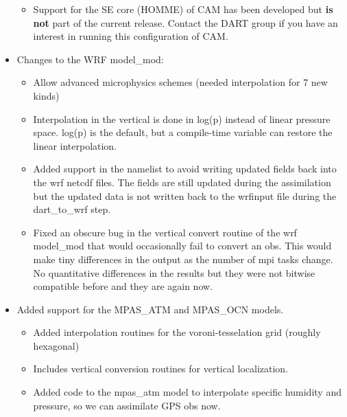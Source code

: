 \documentclass[letterpaper,10pt,english]{sphinxmanual}
\begin{document}
\begin{itemize}
\begin{itemize}
\begin{itemize}
\end{itemize}

\item {} 
Support for the SE core (HOMME) of CAM has been developed but
\textbf{is not} part of the current release. Contact the DART group
if you have an interest in running this configuration of CAM.

\end{itemize}

\item {} 
Changes to the WRF model\_mod:
\begin{itemize}
\item {} 
Allow advanced microphysics schemes (needed interpolation for 7
new kinds)

\item {} 
Interpolation in the vertical is done in log(p) instead of
linear pressure space. log(p) is the default, but a compile-time
variable can restore the linear interpolation.

\item {} 
Added support in the namelist to avoid writing updated fields
back into the wrf netcdf files. The fields are still updated
during the assimilation but the updated data is not written back
to the wrfinput file during the dart\_to\_wrf step.

\item {} 
Fixed an obscure bug in the vertical convert routine of the wrf
model\_mod that would occasionally fail to convert an obs. This
would make tiny differences in the output as the number of mpi
tasks change. No quantitative differences in the results but
they were not bitwise compatible before and they are again now.

\end{itemize}

\item {} 
Added support for the MPAS\_ATM and MPAS\_OCN models.
\begin{itemize}
\item {} 
Added interpolation routines for the voroni-tesselation grid
(roughly hexagonal)

\item {} 
Includes vertical conversion routines for vertical localization.

\item {} 
Added code to the mpas\_atm model to interpolate specific
humidity and pressure, so we can assimilate GPS obs now.

\end{itemize}


\end{itemize}
\end{document}
